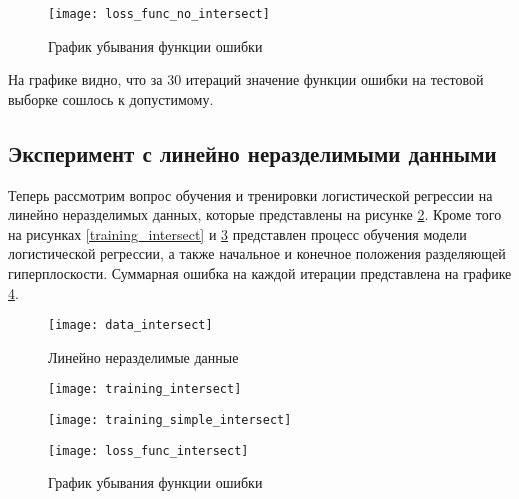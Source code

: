 \begin{figure}[h]
    \centering
    \texttt{[image: loss\_func\_no\_intersect]}
    \caption{График убывания функции ошибки}
    \label{loss_func_no_intersect}
\end{figure}

На графике видно, что за 30 итераций значение функции ошибки на тестовой выборке сошлось к допустимому.

\subsection{Эксперимент с линейно неразделимыми данными}
Теперь рассмотрим вопрос обучения и тренировки логистической регрессии на линейно неразделимых данных, которые представлены на рисунке \ref{data_intersect}. Кроме того на рисунках \ref{training_intersect} и \ref{training_simple_intersect} представлен процесс обучения модели логистической регрессии, а также начальное и конечное положения разделяющей гиперплоскости. Суммарная ошибка на каждой итерации представлена на графике \ref{loss_func_intersect}.

\begin{figure}[h]
    \centering
    \texttt{[image: data\_intersect]}
    \caption{Линейно неразделимые данные}
    \label{data_intersect}
\end{figure}

\begin{figure}
\centering
\begin{minipage}{.5\textwidth}
  \centering
  \texttt{[image: training\_intersect]}
  \label{training_intersect}
\end{minipage}%
\begin{minipage}{.5\textwidth}
  \centering
  \texttt{[image: training\_simple\_intersect]}
  \label{training_simple_intersect}
\end{minipage}
\end{figure}


\begin{figure}[h]
    \centering
    \texttt{[image: loss\_func\_intersect]}
    \caption{График убывания функции ошибки}
    \label{loss_func_intersect}
\end{figure}